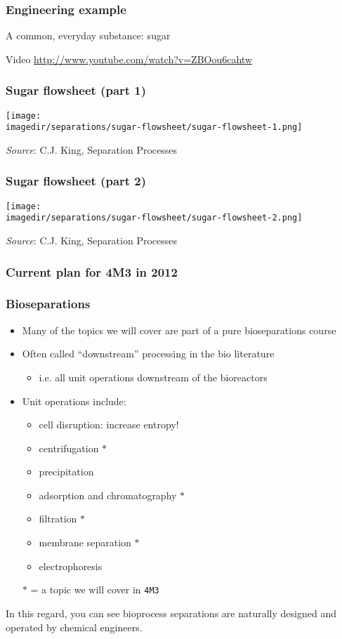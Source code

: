 \begin{frame}\frametitle{Engineering example}
	A common, everyday substance: sugar
	
	
	Video \href{http://www.youtube.com/watch?v=ZBOou6cahtw}{http://www.youtube.com/watch?v=ZBOou6cahtw}
	
\end{frame}

\begin{frame}\frametitle{Sugar flowsheet (part 1)}
	\begin{center}
		\texttt{[image: \\imagedir/separations/sugar-flowsheet/sugar-flowsheet-1.png]}
	\end{center}
	\emph{Source}: C.J. King, Separation Processes
\end{frame}

\begin{frame}\frametitle{Sugar flowsheet (part 2)}
	\begin{center}
		\texttt{[image: \\imagedir/separations/sugar-flowsheet/sugar-flowsheet-2.png]}
	\end{center}
	\emph{Source}: C.J. King, Separation Processes
\end{frame}

\begin{frame}\frametitle{Current plan for 4M3 in 2012}
	\begin{center}
	\end{center}
\end{frame}

\begin{frame}\frametitle{Bioseparations}
	\begin{itemize}
		\item	Many of the topics we will cover are part of a pure bioseparations course
		\item	Often called ``downstream'' processing in the bio literature
		\begin{itemize}
			\item	i.e. all unit operations downstream of the bioreactors
		\end{itemize}
		\item	Unit operations include:
		\begin{itemize}
			\item	cell disruption: increase entropy!
			\item	centrifugation $\ast$
			\item	precipitation
			\item	adsorption and chromatography $\ast$
			\item	filtration $\ast$
			\item	membrane separation $\ast$
			\item	electrophoresis
		\end{itemize}
		\vspace{12pt}
		$\ast$ = a topic we will cover in \texttt{4M3}
	\end{itemize}
	\vspace{12pt}
	In this regard, you can see bioprocess separations are naturally designed and operated by chemical engineers.
\end{frame}


